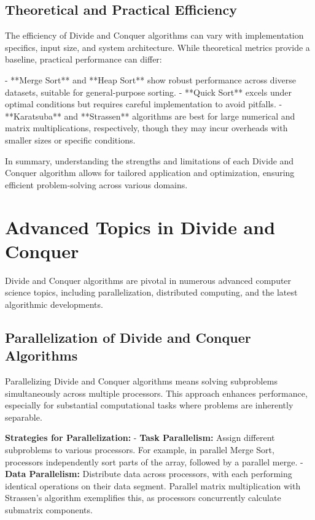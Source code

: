 \documentclass[12pt]{book} %
\begin{document}
\subsection{Theoretical and Practical Efficiency}

The efficiency of Divide and Conquer algorithms can vary with implementation specifics, input size, and system architecture. While theoretical metrics provide a baseline, practical performance can differ:

- **Merge Sort** and **Heap Sort** show robust performance across diverse datasets, suitable for general-purpose sorting.
- **Quick Sort** excels under optimal conditions but requires careful implementation to avoid pitfalls.
- **Karatsuba** and **Strassen** algorithms are best for large numerical and matrix multiplications, respectively, though they may incur overheads with smaller sizes or specific conditions.

In summary, understanding the strengths and limitations of each Divide and Conquer algorithm allows for tailored application and optimization, ensuring efficient problem-solving across various domains.


\section{Advanced Topics in Divide and Conquer}

Divide and Conquer algorithms are pivotal in numerous advanced computer science topics, including parallelization, distributed computing, and the latest algorithmic developments.

\subsection{Parallelization of Divide and Conquer Algorithms}

Parallelizing Divide and Conquer algorithms means solving subproblems simultaneously across multiple processors. This approach enhances performance, especially for substantial computational tasks where problems are inherently separable. 

\textbf{Strategies for Parallelization:}
- \textbf{Task Parallelism:} Assign different subproblems to various processors. For example, in parallel Merge Sort, processors independently sort parts of the array, followed by a parallel merge.
- \textbf{Data Parallelism:} Distribute data across processors, with each performing identical operations on their data segment. Parallel matrix multiplication with Strassen's algorithm exemplifies this, as processors concurrently calculate submatrix components.
\end{document}
